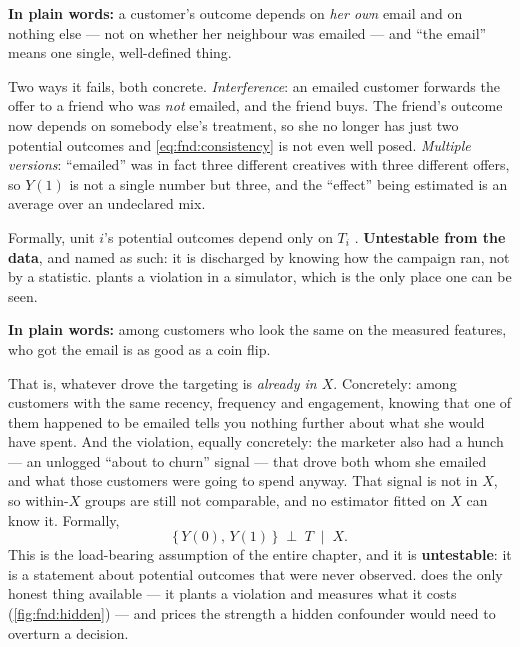 \begin{assumption}\label{as:fnd:sutva}
\textbf{In plain words:} a customer's outcome depends on \emph{her own} email and on nothing
else --- not on whether her neighbour was emailed --- and ``the email'' means one single,
well-defined thing.

Two ways it fails, both concrete. \emph{Interference}: an emailed customer forwards the offer
to a friend who was \emph{not} emailed, and the friend buys. The friend's outcome now depends
on somebody else's treatment, so she no longer has just two potential outcomes and
\cref{eq:fnd:consistency} is not even well posed. \emph{Multiple versions}: ``emailed'' was in
fact three different creatives with three different offers, so $Y(1)$ is not a single number
but three, and the ``effect'' being estimated is an average over an undeclared mix.

Formally, unit $i$'s potential outcomes depend only on $T_i$ \citep{rubin1980, imbens2015}.
\textbf{Untestable from the data}, and named as such: it is discharged by knowing how the
campaign ran, not by a statistic.  plants a violation in a simulator, which is the
only place one can be seen.
\end{assumption}

\begin{assumption}[Unconfoundedness]\label{as:fnd:unconf}
\textbf{In plain words:} among customers who look the same on the measured features, who got
the email is as good as a coin flip.

That is, whatever drove the targeting is \emph{already in $X$}. Concretely: among customers
with the same recency, frequency and engagement, knowing that one of them happened to be
emailed tells you nothing further about what she would have spent. And the violation, equally
concretely: the marketer also had a hunch --- an unlogged ``about to churn'' signal --- that
drove both whom she emailed and what those customers were going to spend anyway. That signal is
not in $X$, so within-$X$ groups are still not comparable, and no estimator fitted on $X$ can
know it. Formally,
%
\begin{equation}
  \{\,Y(0),\, Y(1)\,\} \;\perp\; T \;\;\big|\;\; X .
  \label{eq:fnd:unconf}
\end{equation}
%
This is the load-bearing assumption of the entire chapter, and it is \textbf{untestable}: it is
a statement about potential outcomes that were never observed.  does the
only honest thing available --- it plants a violation and measures what it costs
(\cref{fig:fnd:hidden}) --- and  prices the strength a hidden confounder would need
to overturn a decision.
\end{assumption}

